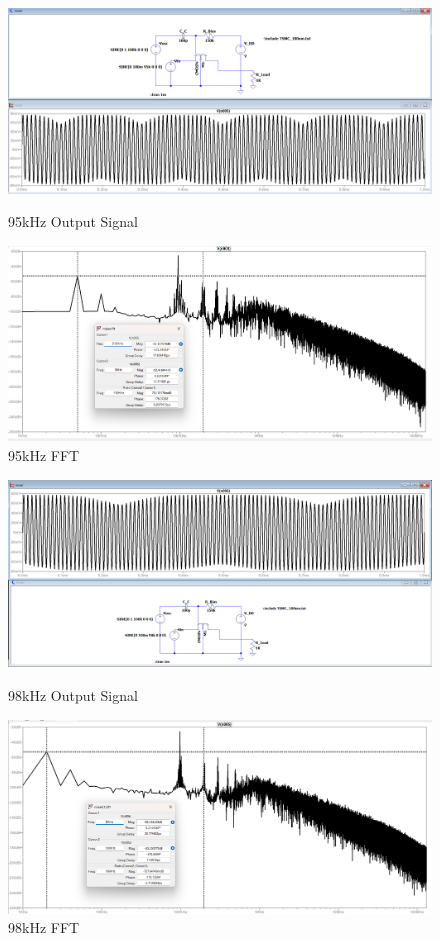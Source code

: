 \begin{figure}[H]
    \centering
        \includegraphics[width=1\linewidth]{fig/95.png}
        \caption{95kHz Output Signal}
         \includegraphics[width=1\linewidth]{fig/95fft.png}
        \caption{95kHz FFT}

\end{figure}
\begin{figure}
    \centering
    \includegraphics[width=1\linewidth]{fig/98.png}
    \caption{98kHz Output Signal}
    
    \includegraphics[width=1\linewidth]{98fft.png}
    \caption{98kHz FFT}
\end{figure}
